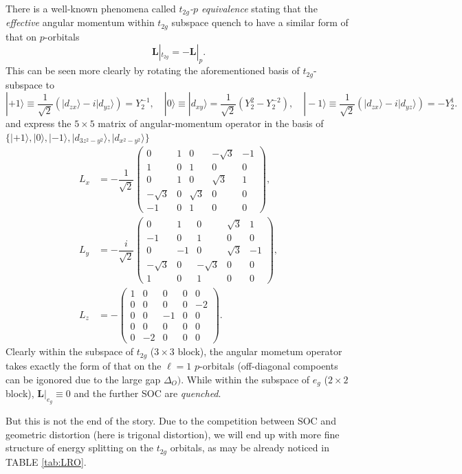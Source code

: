 \documentclass[10pt,nofootinbib,letterpaper]{revtex4}
\begin{document}
		There is a well-known phenomena called \emph{$t_{2g}$-$p$ equivalence} \cite{sugano2012multiplets} stating that the \emph{effective} angular momentum within $t_{2g}$ subspace quench to have a similar form of that on $p$-orbitals
		\begin{equation}\label{1.1.1}
			\mathbf{L}|_{t_{2g}}=-\mathbf{L}|_{p}.
		\end{equation}
		This can be seen more clearly by rotating the aforementioned basis of $t_{2g}$-subspace to
		\begin{equation*}
			|+1\rangle\equiv\dfrac{1}{\sqrt 2}(|d_{zx}\rangle-i|d_{yz}\rangle)=Y_2^{-1},\quad |0\rangle\equiv|d_{xy}\rangle=\dfrac{1}{\sqrt{2}}(Y_2^2-Y_2^{-2}),\quad|-1\rangle\equiv\dfrac{1}{\sqrt 2}(|d_{zx}\rangle-i|d_{yz}\rangle)=-Y_2^1.
		\end{equation*}
		and express the $5\times 5$ matrix of angular-momentum operator in the basis of $\{|+1\rangle,|0\rangle,|-1\rangle,|d_{3z^2-y^2}\rangle,|d_{x^2-y^2}\rangle\}$
		\begin{align*}
			L_x&=-\dfrac{1}{\sqrt 2}\left(\begin{array}{ccc|cc}
				0 & 1 & 0 & -\sqrt3 & -1\\
				1 & 0 & 1 & 0 & 0\\
				0 & 1 & 0 & \sqrt3 & 1\\
				\hline
				-\sqrt3 & 0 & \sqrt3 & 0 & 0\\
				-1 & 0 & 1 & 0 & 0
			\end{array}\right),\\[1em]
			L_y&=-\dfrac{i}{\sqrt{2}}\left(\begin{array}{ccc|cc}
				0 & 1 & 0 & \sqrt3 & 1\\
				-1 & 0 & 1 & 0 & 0\\
				0 & -1 & 0 & \sqrt3 & -1\\
				\hline
				-\sqrt3 & 0 & -\sqrt{3} & 0 & 0\\
				1 & 0 & 1 & 0 & 0
			\end{array}\right),\\[1em]
			L_z&=-\left(\begin{array}{ccc|cc}
				1 & 0 & 0 & 0 & 0\\
				0 & 0 & 0 & 0 & -2\\
				0 & 0 & -1 & 0 & 0\\
				\hline
				0 & 0 & 0 & 0 & 0\\
				0 & -2 & 0 & 0 & 0
			\end{array} \right).
		\end{align*}
		Clearly within the subspace of $t_{2g}$ ($3\times3$ block), the angular mometum operator takes exactly the form of that on the $\ell=1$ $p$-orbitals (off-diagonal compoents can be igonored due to the large gap $\Delta_O)$. While within the subspace of $e_g$ ($2\times2$ block), $\mathbf{L}|_{e_g}\equiv0$ and the further SOC are \emph{quenched}.\par
		But this is not the end of the story. Due to the competition between SOC and geometric distortion (here is trigonal distortion), we will end up with more fine structure of energy splitting on the $t_{2g}$ orbitals, as may be already noticed in TABLE \ref{tab:LRO}.
	
\end{document}
